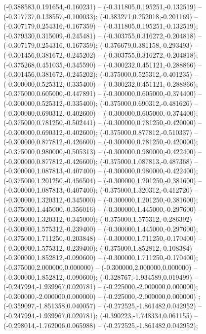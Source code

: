  (-0.388583,0.191654,-0.160231) -- (-0.311805,0.195251,-0.132519) -- (-0.317737,0.138557,-0.100033);
 (-0.383271,0.252018,-0.201169) -- (-0.307179,0.254316,-0.167359) -- (-0.311805,0.195251,-0.132519);
 (-0.379330,0.315009,-0.245481) -- (-0.303755,0.316272,-0.204818) -- (-0.307179,0.254316,-0.167359);
 (-0.376679,0.381158,-0.293493) -- (-0.301456,0.381672,-0.245202) -- (-0.303755,0.316272,-0.204818);
 (-0.375268,0.451035,-0.345590) -- (-0.300232,0.451121,-0.288866) -- (-0.301456,0.381672,-0.245202);
 (-0.375000,0.525312,-0.401235) -- (-0.300000,0.525312,-0.335400) -- (-0.300232,0.451121,-0.288866);
 (-0.375000,0.605000,-0.447891) -- (-0.300000,0.605000,-0.374400) -- (-0.300000,0.525312,-0.335400);
 (-0.375000,0.690312,-0.481626) -- (-0.300000,0.690312,-0.402600) -- (-0.300000,0.605000,-0.374400);
 (-0.375000,0.781250,-0.502441) -- (-0.300000,0.781250,-0.420000) -- (-0.300000,0.690312,-0.402600);
 (-0.375000,0.877812,-0.510337) -- (-0.300000,0.877812,-0.426600) -- (-0.300000,0.781250,-0.420000);
 (-0.375000,0.980000,-0.505313) -- (-0.300000,0.980000,-0.422400) -- (-0.300000,0.877812,-0.426600);
 (-0.375000,1.087813,-0.487368) -- (-0.300000,1.087813,-0.407400) -- (-0.300000,0.980000,-0.422400);
 (-0.375000,1.201250,-0.456504) -- (-0.300000,1.201250,-0.381600) -- (-0.300000,1.087813,-0.407400);
 (-0.375000,1.320312,-0.412720) -- (-0.300000,1.320312,-0.345000) -- (-0.300000,1.201250,-0.381600);
 (-0.375000,1.445000,-0.356016) -- (-0.300000,1.445000,-0.297600) -- (-0.300000,1.320312,-0.345000);
 (-0.375000,1.575312,-0.286392) -- (-0.300000,1.575312,-0.239400) -- (-0.300000,1.445000,-0.297600);
 (-0.375000,1.711250,-0.203848) -- (-0.300000,1.711250,-0.170400) -- (-0.300000,1.575312,-0.239400);
 (-0.375000,1.852812,-0.108384) -- (-0.300000,1.852812,-0.090600) -- (-0.300000,1.711250,-0.170400);
 (-0.375000,2.000000,0.000000) -- (-0.300000,2.000000,0.000000) -- (-0.300000,1.852812,-0.090600);
 (-0.328767,-1.934589,0.019499) -- (-0.247994,-1.939967,0.020781) -- (-0.225000,-2.000000,0.000000);
 (-0.300000,-2.000000,0.000000) -- (-0.225000,-2.000000,0.000000) ;
 (-0.359097,-1.851358,0.040057) -- (-0.272525,-1.861482,0.042952) -- (-0.247994,-1.939967,0.020781);
 (-0.390223,-1.748334,0.061155) -- (-0.298014,-1.762006,0.065988) -- (-0.272525,-1.861482,0.042952);

